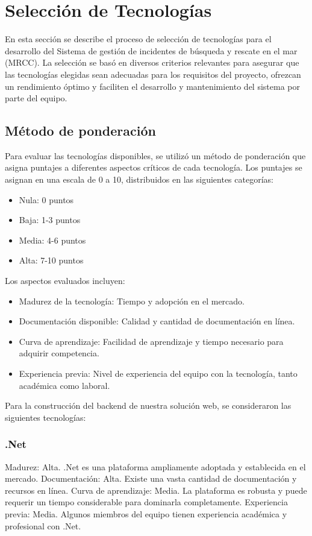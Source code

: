 \section{Selección de Tecnologías}\label{sec:seleccionDeTecnologias}

En esta sección se describe el proceso de selección de tecnologías para el desarrollo del Sistema de gestión de incidentes de búsqueda y rescate en el mar (MRCC). 
La selección se basó en diversos criterios relevantes para asegurar que las tecnologías elegidas sean adecuadas para los requisitos del proyecto, ofrezcan un rendimiento óptimo y 
faciliten el desarrollo y mantenimiento del sistema por parte del equipo.

\subsection{Método de ponderación}

Para evaluar las tecnologías disponibles, se utilizó un método de ponderación que asigna puntajes a diferentes aspectos críticos de cada tecnología. Los puntajes se asignan en una escala de 0 a 10, 
distribuidos en las siguientes categorías:

\begin{itemize}
    \item Nula: 0 puntos
    \item Baja: 1-3 puntos
    \item Media: 4-6 puntos
    \item Alta: 7-10 puntos
\end{itemize}

Los aspectos evaluados incluyen:

\begin{itemize}
    \item Madurez de la tecnología: Tiempo y adopción en el mercado.
    \item Documentación disponible: Calidad y cantidad de documentación en línea.
    \item Curva de aprendizaje: Facilidad de aprendizaje y tiempo necesario para adquirir competencia.
    \item Experiencia previa: Nivel de experiencia del equipo con la tecnología, tanto académica como laboral.
\end{itemize}


Para la construcción del backend de nuestra solución web, se consideraron las siguientes tecnologías:

\subsubsection{.Net}
Madurez: Alta. .Net es una plataforma ampliamente adoptada y establecida en el mercado.
Documentación: Alta. Existe una vasta cantidad de documentación y recursos en línea.
Curva de aprendizaje: Media. La plataforma es robusta y puede requerir un tiempo considerable para dominarla completamente.
Experiencia previa: Media. Algunos miembros del equipo tienen experiencia académica y profesional con .Net.

